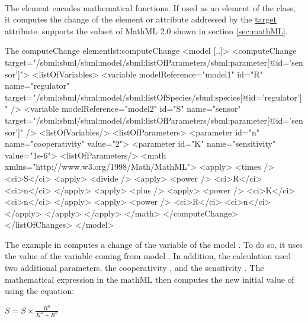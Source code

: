 \paragraph{}
\label{sec:math}

The  element encodes mathematical functions. 
If used as an element of the  class, it computes the change of the element or attribute addressed by the \hyperref[sec:target]{target} attribute.
\currentLV supports the subset of MathML 2.0 shown in section \ref{sec:mathML}.


\begin{myXmlLst}{The computeChange element}{lst:computeChange}
<model [..]>
    <computeChange target="/sbml:sbml/sbml:model/sbml:listOfParameters/sbml:parameter[@id='sensor']">
      <listOfVariables>
        <variable modelReference="model1" id="R" name="regulator" 
                  target="/sbml:sbml/sbml:model/sbml:listOfSpecies/sbml:species[@id='regulator']" />
        <variable modelReference="model2" id="S" name="sensor"
                  target="/sbml:sbml/sbml:model/sbml:listOfParameters/sbml:parameter[@id='sensor']" />
      <listOfVariables/>
      <listOfParameters>
        <parameter id="n" name="cooperativity" value="2">
        <parameter id="K" name="sensitivity" value="1e-6">
      <listOfParameters/>
      <math  xmlns="http://www.w3.org/1998/Math/MathML">
        <apply>
          <times />
          <ci>S</ci>
          <apply>
            <divide />
            <apply>
              <power />
              <ci>R</ci>
              <ci>n</ci>
            </apply>
            <apply>
              <plus />
              <apply>
                <power />
                <ci>K</ci>
                <ci>n</ci>
              </apply>
              <apply>
                <power />
                <ci>R</ci>
                <ci>n</ci>
              </apply>
            </apply> 
          </apply>
        </math>
    </computeChange>
  </listOfChanges>
</model>
\end{myXmlLst}

The example in  computes a change of the variable  of the model . To do so, it uses the value of the variable  coming from model . In addition, the calculation used two additional parameters, the cooperativity , and the sensitivity .
The mathematical expression in the mathML then computes the new initial value of  using the equation:

\begin{math}
S =  S \times \frac{R^{n}}{K^{n}+R^{n}}
\end{math}

